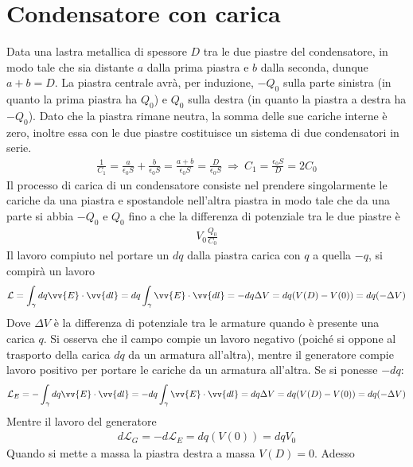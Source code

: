 \documentclass[a4paper, oneside]{article}
\begin{document}
\section{Condensatore con carica}
Data una lastra metallica di spessore $D$ tra le due piastre
del condensatore, in modo tale che sia distante $a$ dalla prima 
piastra e $b$ dalla seconda, dunque $a + b = D$. 
La piastra centrale avrà, per induzione, $-Q_0$ sulla parte sinistra
(in quanto la prima piastra ha $Q_0$) e $Q_0$ sulla destra
(in quanto la piastra a destra ha $-Q_0$). Dato che la piastra rimane neutra, 
la somma delle sue cariche interne è zero, inoltre essa con le due
piastre costituisce un sistema di due condensatori in serie. 
\begin{gather*}
    \frac{1}{C_1} = \frac{a}{\epsilon_0 S} + \frac{b}{\epsilon_0 S} = \frac{a + b}{\epsilon_0 S} = \frac{D}{\epsilon_0 S} \ \Longrightarrow \ C_1 = \frac{\epsilon_0 S}{D} = 2C_0
\end{gather*}
Il processo di carica di un condensatore consiste nel prendere singolarmente le cariche da una piastra e spostandole
nell'altra piastra in modo tale che da una parte si abbia $-Q_0$ e $Q_0$ fino a 
che la differenza di potenziale tra le due piastre è 
\begin{gather*}
    V_0 \frac{Q_0}{C_0}
\end{gather*}
Il lavoro compiuto nel portare un $dq$ dalla piastra carica con $q$ a quella $-q$, si 
compirà un lavoro 
\begin{gather*}
    \mathcal{L} = \int_{\gamma} dq\vv{E} \cdot \vv{dl} = dq \int_{\gamma} \vv{E} \cdot \vv{dl} = -dq \Delta V  = dq(V(D) - V(0)) = dq(-\Delta V)
\end{gather*}
Dove $\Delta V$ è la differenza di potenziale tra le armature quando è presente
una carica $q$. Si osserva che il campo compie un lavoro negativo (poiché 
si oppone al trasporto della carica $dq$ da un armatura all'altra), mentre il generatore
compie lavoro positivo per portare le cariche da un armatura all'altra. Se si ponesse $-dq$:
\begin{gather*}
    \mathcal{L}_{E} = -\int_{\gamma} dq\vv{E} \cdot \vv{dl} = -dq \int_{\gamma} \vv{E} \cdot \vv{dl} = dq \Delta V  = dq(V(D) - V(0)) = dq(-\Delta V)
\end{gather*}
Mentre il lavoro del generatore
\begin{gather*}
    d\mathcal{L}_{G} = - d\mathcal{L}_{E} = dq(V(0)) = dqV_0
\end{gather*}
Quando si mette a massa la piastra destra a massa  $V(D) = 0$. Adesso 
\end{document}
